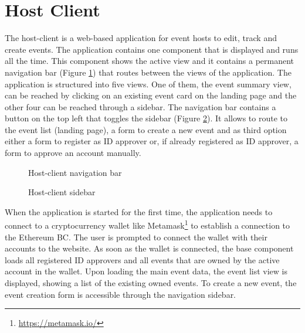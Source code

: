 \section{Host Client}

The host-client is a web-based application for event hosts to edit, track and create events. The application contains one component that is displayed and runs all the time. This component shows the active view and it contains a permanent navigation bar (Figure \ref{img:host-client-navbar}) that routes between the views of the application. The application is structured into five views. One of them, the event summary view, can be reached by clicking on an existing event card on the landing page and the other four can be reached through a sidebar. The navigation bar contains a button on the top left that toggles the sidebar (Figure \ref{img:host-client-sidebar}). It allows to route to the event list (landing page), a form to create a new event and as third option either a form to register as ID approver or, if already registered as ID approver, a form to approve an account manually.

\begin{figure}[H]
    \centering
    \caption{Host-client navigation bar \protect}
    \label{img:host-client-navbar}
\end{figure}

\begin{figure}[H]
    \centering
    \caption{Host-client sidebar \protect}
    \label{img:host-client-sidebar}
\end{figure}

When the application is started for the first time, the application needs to connect to a cryptocurrency wallet like Metamask\footnote{\href{https://metamask.io/}{https://metamask.io/}} to establish a connection to the Ethereum BC. The user is prompted to connect the wallet with their accounts to the website. As soon as the wallet is connected, the base component loads all registered ID approvers and all events that are owned by the active account in the wallet. Upon loading the main event data, the event list view is displayed, showing a list of the existing owned events. To create a new event, the event creation form is accessible through the navigation sidebar.

